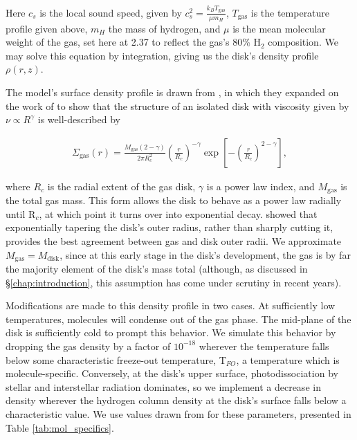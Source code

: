 Here $c_s$ is the local sound speed, given by $c_s^2 = \frac{k_B T_\text{gas}}{\mu m_H}$, $T_\text{gas}$ is the temperature profile given above, $m_H$ the mass of hydrogen, and $\mu$ is the mean molecular weight of the gas, set here at 2.37 to reflect the gas's 80\% H$_2$ composition. We may solve this equation by integration, giving us the disk's density profile $\rho(r, z)$.


The model's surface density profile is drawn from \citet{Hartmann1998}, in which they expanded on the work of \citet{LyndenBell1974} to show that the structure of an isolated disk with viscosity given by $\nu \propto R^\gamma$ is well-described by



\begin{align}
  \Sigma_{\text{gas}}(r) = \frac{M_{\text{gas}} (2 - \gamma)}{2 \pi R_c^2} \left(\frac{r}{R_c} \right)^{-\gamma} \exp \left[-\left(\frac{r}{R_c} \right)^{2-\gamma} \right],
\end{align}

\noindent
where $R_c$ is the radial extent of the gas disk, $\gamma$ is a power law index, and $M_\text{gas}$ is the total gas mass. This form allows the disk to behave as a power law radially until R$_c$, at which point it turns over into exponential decay. \citet{Hughes2008} showed that exponentially tapering the disk's outer radius, rather than sharply cutting it, provides the best agreement between gas and disk outer radii. We approximate $M_\text{gas} = M_\text{disk}$, since at this early stage in the disk's development, the gas is by far the majority element of the disk's mass total (although, as discussed in \S\ref{chap:introduction}, this assumption has come under scrutiny in recent years).



Modifications are made to this density profile in two cases. At sufficiently low temperatures, molecules will condense out of the gas phase. The mid-plane of the disk is sufficiently cold to prompt this behavior. We simulate this behavior by dropping the gas density by a factor of $10^{-18}$ wherever the temperature falls below some characteristic freeze-out temperature, T$_{FO}$, a temperature which is molecule-specific. Conversely, at the disk's upper surface, photodissociation by stellar and interstellar radiation dominates, so we implement a decrease in density wherever the hydrogen column density at the disk's surface falls below a characteristic value. We use values drawn from \cite{Factor2017} for these parameters, presented in Table \ref{tab:mol_specifics}.


